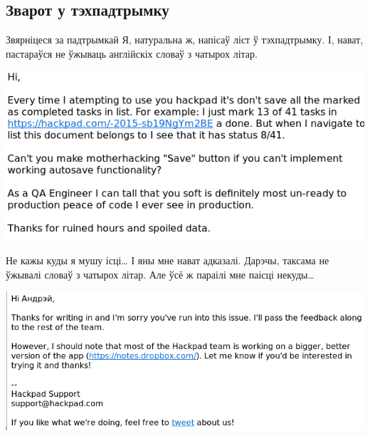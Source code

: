\documentclass[ignorenonframetext,hyperref={pdftex,unicode}]{beamer}
\begin{document}
\subsection{Зварот у тэхпадтрымку}
\begin{frame}{Звярніцеся за падтрымкай}
	Я, натуральна ж, напісаў ліст ў тэхпадтрымку. І, нават, пастараўся не ўжываць англійскіх словаў з чатырох літар.
	\begin{center}
 		\includegraphics[height=0.5\textheight,keepaspectratio]{support0}
	\end{center}
\end{frame}

\begin{frame}{Не кажы куды я мушу ісці…}
	І яны мне нават адказалі. Дарэчы, таксама не ўжывалі словаў з чатырох літар. Але ўсё ж параілі мне паісці некуды…
	\begin{center}
 		\includegraphics[height=0.3\textheight,keepaspectratio]{support1}
	\end{center}
\end{frame}
\end{document}
